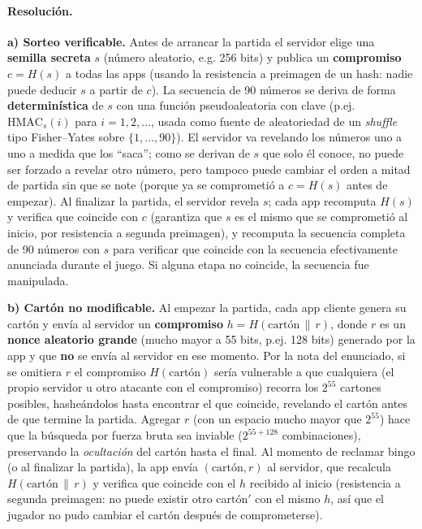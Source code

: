 \paragraph{Resolución.}

\textbf{a) Sorteo verificable.} Antes de arrancar la partida el servidor elige una
\textbf{semilla secreta} $s$ (número aleatorio, e.g. 256 bits) y publica un
\textbf{compromiso} $c=H(s)$ a todas las apps (usando la resistencia a preimagen de un
hash: nadie puede deducir $s$ a partir de $c$). La secuencia de 90 números se deriva de
forma \textbf{determinística} de $s$ con una función pseudoaleatoria con clave (p.ej.
$\mathrm{HMAC}_s(i)$ para $i=1,2,\dots$, usada como fuente de aleatoriedad de un
\emph{shuffle} tipo Fisher--Yates sobre $\{1,\dots,90\}$). El servidor va revelando los
números uno a uno a medida que los ``saca''; como se derivan de $s$ que solo él conoce, no
puede ser forzado a revelar otro número, pero tampoco puede cambiar el orden a mitad de
partida sin que se note (porque ya se comprometió a $c=H(s)$ antes de empezar). Al
finalizar la partida, el servidor revela $s$; cada app recomputa $H(s)$ y verifica que
coincide con $c$ (garantiza que $s$ es el mismo que se comprometió al inicio, por
resistencia a segunda preimagen), y recomputa la secuencia completa de 90 números con $s$
para verificar que coincide con la secuencia efectivamente anunciada durante el juego. Si
alguna etapa no coincide, la secuencia fue manipulada.

\textbf{b) Cartón no modificable.} Al empezar la partida, cada app cliente genera su
cartón y envía al servidor un \textbf{compromiso} $h=H(\text{cartón}\,\|\,r)$, donde $r$ es
un \textbf{nonce aleatorio grande} (mucho mayor a 55 bits, p.ej. 128 bits) generado por la
app y que \textbf{no} se envía al servidor en ese momento. Por la nota del enunciado, si se
omitiera $r$ el compromiso $H(\text{cartón})$ sería vulnerable a que cualquiera (el propio
servidor u otro atacante con el compromiso) recorra los $2^{55}$ cartones posibles,
hasheándolos hasta encontrar el que coincide, revelando el cartón antes de que termine la
partida. Agregar $r$ (con un espacio mucho mayor que $2^{55}$) hace que la búsqueda por
fuerza bruta sea inviable ($2^{55+128}$ combinaciones), preservando la \emph{ocultación}
del cartón hasta el final. Al momento de reclamar bingo (o al finalizar la partida), la app
envía $(\text{cartón}, r)$ al servidor, que recalcula $H(\text{cartón}\,\|\,r)$ y verifica
que coincide con el $h$ recibido al inicio (resistencia a segunda preimagen: no puede
existir otro cartón$'$ con el mismo $h$, así que el jugador no pudo cambiar el cartón
después de comprometerse).

